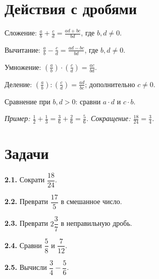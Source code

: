 \section{Действия с дробями}
Сложение: \(\frac{a}{b} + \frac{c}{d} = \frac{ad + bc}{bd}\), где \(b,\allowbreak d \ne  0\).\par
Вычитание: \(\frac{a}{b} - \frac{c}{d} = \frac{ad - bc}{bd}\), где \(b,\allowbreak d \ne  0\).\par
Умножение: \((\frac{a}{b}) \cdot  (\frac{c}{d}) = \frac{ac}{bd}\).\par
Деление: \((\frac{a}{b}) : (\frac{c}{d}) = \frac{ad}{bc}\); дополнительно \(c \ne  0\).\par
Сравнение при \(b,\allowbreak d > 0\): сравни \(a \cdot  d\) и \(c \cdot  b\).\par
{\small\textit{Пример: \(\frac{1}{2} + \frac{1}{3} = \frac{3}{6} + \frac{2}{6} = \frac{5}{6}\). Сокращение: \(\frac{18}{24} = \frac{3}{4}\).}}\par
{}\section*{Задачи}
\begingroup\setlength{\parskip}{2pt}
\noindent\begin{minipage}[t]{\linewidth}\textbf{2.1.} Сократи \(\dfrac{18}{24}\).\par\end{minipage}\par
\noindent\begin{minipage}[t]{\linewidth}\textbf{2.2.} Преврати \(\dfrac{17}{5}\) в смешанное число.\par\end{minipage}\par
\noindent\begin{minipage}[t]{\linewidth}\textbf{2.3.} Преврати \(2 \dfrac{3}{7}\) в неправильную дробь.\par\end{minipage}\par
\noindent\begin{minipage}[t]{\linewidth}\textbf{2.4.} Сравни \(\dfrac{5}{8}\) и \(\dfrac{7}{12}\).\par\end{minipage}\par
\noindent\begin{minipage}[t]{\linewidth}\textbf{2.5.} Вычисли \(\dfrac{3}{4} - \dfrac{5}{6}\).\par\end{minipage}\par
